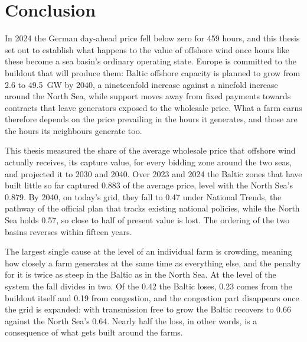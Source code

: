 
\section{Conclusion}\label{sec:conclusion}

In 2024 the German day-ahead price fell below zero for 459 hours, and this
thesis set out to establish what happens to the value of offshore wind once
hours like these become a sea basin's ordinary operating state. Europe is
committed to the buildout that will produce them: Baltic offshore capacity is
planned to grow from 2.6 to 49.5~GW by 2040, a nineteenfold increase against a
ninefold increase around the North Sea, while support moves away from fixed
payments towards contracts that leave generators exposed to the wholesale
price. What a farm earns therefore depends on the price prevailing in the
hours it generates, and those are the hours its neighbours generate too.

This thesis measured the share of the average wholesale price that offshore
wind actually receives, its capture value, for every bidding zone around the
two seas, and projected it to 2030 and 2040. Over 2023 and 2024 the Baltic
zones that have built little so far captured 0.883 of the average price, level
with the North Sea's 0.879. By 2040, on today's grid, they fall to 0.47 under
National Trends, the pathway of the official plan that tracks existing
national policies, while the North Sea holds 0.57, so close to half of present
value is lost. The ordering of the two basins reverses within fifteen years.

The largest single cause at the level of an individual farm is crowding,
meaning how closely a farm generates at the same time as everything else, and
the penalty for it is twice as steep in the Baltic as in the North Sea. At the
level of the system the fall divides in two. Of the 0.42 the Baltic loses,
0.23 comes from the buildout itself and 0.19 from congestion, and the
congestion part disappears once the grid is expanded: with transmission free
to grow the Baltic recovers to 0.66 against the North Sea's 0.64. Nearly half
the loss, in other words, is a consequence of what gets built around the
farms.

